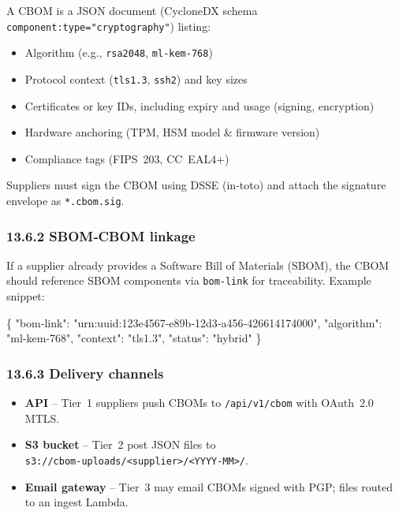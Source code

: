 \documentclass[
  english,
]{article}
\newenvironment{Shaded}{}{}
\newcommand{\DataTypeTok}[1]{\textcolor[rgb]{0.56,0.13,0.00}{#1}}
\newcommand{\FunctionTok}[1]{\textcolor[rgb]{0.02,0.16,0.49}{#1}}
\newcommand{\StringTok}[1]{\textcolor[rgb]{0.25,0.44,0.63}{#1}}
\providecommand{\tightlist}{%
  \setlength{\itemsep}{0pt}\setlength{\parskip}{0pt}}
\begin{document}
A CBOM is a JSON document (CycloneDX schema
\texttt{component:type="cryptography"}) listing:

\begin{itemize}
\tightlist
\item
  Algorithm (e.g., \texttt{rsa2048}, \texttt{ml‑kem‑768})
\item
  Protocol context (\texttt{tls1.3}, \texttt{ssh2}) and key sizes
\item
  Certificates or key IDs, including expiry and usage (signing,
  encryption)
\item
  Hardware anchoring (TPM, HSM model \& firmware version)
\item
  Compliance tags (FIPS~203, CC~EAL4+)
\end{itemize}

Suppliers must sign the CBOM using DSSE (in‑toto) and attach the
signature envelope as \texttt{*.cbom.sig}.

\subsubsection{13.6.2 SBOM‑CBOM linkage}\label{sbomcbom-linkage}

If a supplier already provides a Software Bill of Materials (SBOM), the
CBOM should reference SBOM components via \texttt{bom‑link} for
traceability. Example snippet:

\begin{Shaded}
\begin{Highlighting}[]
\FunctionTok{\{}
  \DataTypeTok{"bom‑link"}\FunctionTok{:} \StringTok{"urn:uuid:123e4567‑e89b‑12d3‑a456‑426614174000"}\FunctionTok{,}
  \DataTypeTok{"algorithm"}\FunctionTok{:} \StringTok{"ml‑kem‑768"}\FunctionTok{,}
  \DataTypeTok{"context"}\FunctionTok{:} \StringTok{"tls1.3"}\FunctionTok{,}
  \DataTypeTok{"status"}\FunctionTok{:} \StringTok{"hybrid"}
\FunctionTok{\}}
\end{Highlighting}
\end{Shaded}

\subsubsection{13.6.3 Delivery channels}\label{delivery-channels}

\begin{itemize}
\tightlist
\item
  \textbf{API} -- Tier~1 suppliers push CBOMs to \texttt{/api/v1/cbom}
  with OAuth~2.0 MTLS.
\item
  \textbf{S3 bucket} -- Tier~2 post JSON files to
  \texttt{s3://cbom‑uploads/\textless{}supplier\textgreater{}/\textless{}YYYY‑MM\textgreater{}/}.
\item
  \textbf{Email gateway} -- Tier~3 may email CBOMs signed with PGP;
  files routed to an ingest Lambda.
\end{itemize}
\end{document}
